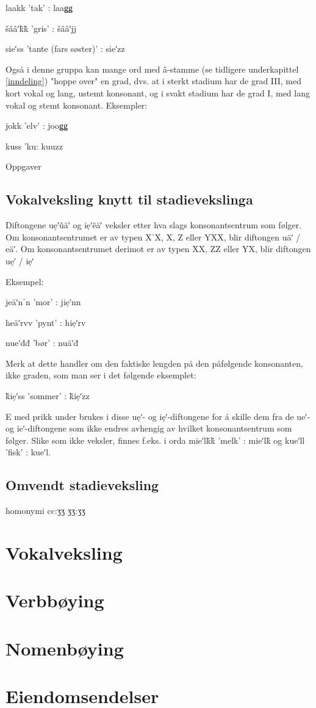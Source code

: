 laakk 'tak' : laaǥǥ

šââʹǩǩ 'gris' : šââʹjj

sieʹss 'tante (fars søster)' : sieʹzz

Også i denne gruppa kan mange ord med â-stamme (se tidligere underkapittel \ref{inndeling}) "hoppe over" en grad, dvs. at i sterkt stadium har de grad III, med kort vokal og lang, ustemt konsonant, og i svakt stadium har de grad I, med lang vokal og stemt konsonant. Eksempler:

jokk 'elv' : jooǥǥ

kuss 'ku: kuuzz

Oppgaver

\subsection{Vokalveksling knytt til stadievekslinga}

Diftongene uẹʹ\~uäʹ og iẹʹ\~eäʹ veksler etter hva slags konsonantsentrum som følger. Om konsonantsentrumet er av typen XˈX, X, Z eller YXX, blir diftongen uäʹ / eäʹ. Om konsonantsentrumet derimot er av typen XX, ZZ eller YX, blir diftongen uẹʹ / iẹʹ

Eksempel:

jeäʹnˈn 'mor' : jiẹʹnn

heäʹrvv 'pynt' : hiẹʹrv

nueʹđđ 'bør' : nuäʹđ

Merk at dette handler om den faktiske lengden på den påfølgende konsonanten, ikke graden, som man ser i det følgende eksemplet:

ǩiẹʹss 'sommer' : ǩiẹʹzz

E med prikk under brukes i disse uẹʹ- og iẹʹ-diftongene for å skille dem fra de ueʹ- og ieʹ-diftongene som ikke endres avhengig av hvilket konsonantsentrum som følger. Slike som ikke veksler, finnes f.eks. i orda mieʹlǩǩ 'melk' : mieʹlǩ og kueʹll 'fisk' : kueʹl.


\subsection{Omvendt stadieveksling}

homonymi cc:ʒʒ ʒʒ:ʒʒ

\section{Vokalveksling}

\section{Verbbøying}

\section{Nomenbøying}

\section{Eiendomsendelser}